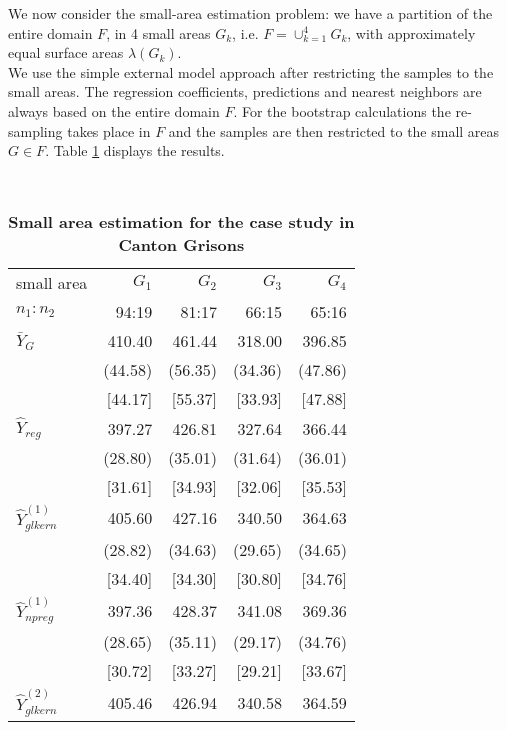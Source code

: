 \documentclass[a4paper,12pt,leqno, titlepage]{article}
\begin{document}
We now consider the small-area estimation problem: we have a partition of the entire domain $F$, in 4 small areas $G_k$, i.e. $F=\cup_{k=1}^4 G_k$, with approximately equal surface areas $\lambda(G_k)$.\\
We use the simple external model approach after restricting the samples to the small areas. The regression coefficients, predictions and nearest neighbors are always based on the entire domain $F$. For the bootstrap calculations the re-sampling takes place in $F$ and the samples are then restricted to the small areas $G\in F$. Table \ref{casestudy2} displays the results.
\clearpage\newpage
\begin{table}[ht]
\begin{center}
\caption{ \label{casestudy2}\textbf{Small area estimation for the case study in Canton Grisons}}\\[0.5cm]
\small
\begin{tabular}{lrrrr}
  \hline
small area               & $G_1$ & $G_2$ & $G_3$ & $G_4$ \\
$n_1:n_2$                & 94:19   & 81:17   & 66:15   & 65:16 \\ \hline \hline
$\bar{Y}_G$              & 410.40  & 461.44  & 318.00  & 396.85  \\
                         & (44.58) & (56.35) & (34.36) & (47.86) \\
                         & [44.17] & [55.37] & [33.93] & [47.88] \\  \hline
$\hat{Y}_{reg}$          & 397.27  & 426.81  & 327.64  & 366.44 \\
                         & (28.80) & (35.01) & (31.64) & (36.01) \\
                         & [31.61] & [34.93] & [32.06] & [35.53] \\ \hline \hline
$\hat{Y}^{(1)}_{glkern}$ & 405.60  & 427.16  & 340.50  & 364.63 \\
                         & (28.82) & (34.63) & (29.65) & (34.65) \\
                         & [34.40] & [34.30] & [30.80] & [34.76] \\  \hline
$\hat{Y}^{(1)}_{npreg}$  & 397.36  & 428.37  & 341.08  & 369.36   \\
                         & (28.65) & (35.11) & (29.17) & (34.76) \\
                         & [30.72] & [33.27] & [29.21] & [33.67] \\  \hline \hline
$\hat{Y}^{(2)}_{glkern}$ & 405.46  & 426.94  & 340.58  & 364.59 \\

\end{tabular}
\end{center}
\end{table}
\end{document}
